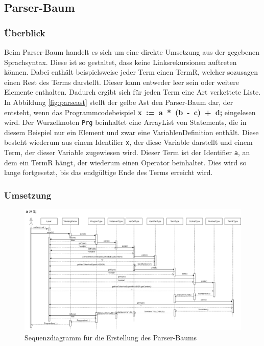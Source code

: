 \subsection{Parser-Baum}\label{subsection:parser}

\subsubsection{Überblick}

Beim Parser-Baum handelt es sich um eine direkte Umsetzung aus der gegebenen Sprachsyntax. 
Diese ist so gestaltet, dass keine Linksrekursionen auftreten können. 
Dabei enthält beispielsweise jeder Term einen TermR, welcher sozusagen einen Rest des Terms darstellt. 
Dieser kann entweder leer sein oder weitere Elemente enthalten. Dadurch ergibt sich für jeden Term eine Art verkettete Liste. 
\newline
\newline
In Abbildung \ref{fig:parseast} stellt der gelbe Ast den Parser-Baum dar, der entsteht, wenn das Programmcodebeispiel \mbox{\textbf{x := a * (b - c) + d;}} eingelesen wird. 
Der Wurzelknoten \texttt{Prg} beinhaltet eine ArrayList von Statements, die in diesem Beispiel nur ein Element und zwar eine VariablenDefinition enthält. 
Diese besteht wiederum aus einem Identifier \texttt{x}, der diese Variable darstellt und einem Term, der dieser Variable zugewiesen wird. 
Dieser Term ist der Identifier \texttt{a}, an dem ein TermR hängt, der wiederum einen Operator beinhaltet. Dies wird so lange fortgesetzt, bis das endgültige Ende des Terms erreicht wird.

\subsubsection{Umsetzung}

\begin{figure}[tbh]
	\hspace{-0.1\linewidth}
	\includegraphics[width=1.2\linewidth]{images/sequenzdiagramm}
	\caption[Sequenzdiagramm Parser]{Sequenzdiagramm für die Erstellung des Parser-Baums}
	\label{fig:sequenzdiagramm}
\end{figure}

